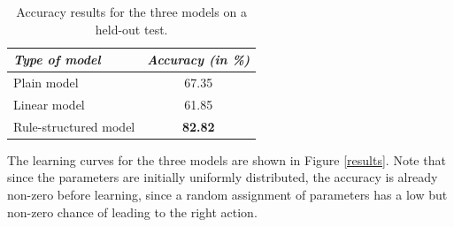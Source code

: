 \begin{table}[h]
\begin{center}
\begin{tabular}{|l|c|} \hline
\textit{Type of model} & \textit{Accuracy (in \%) } \\ \hline \hline
Plain model & 67.35 \\ \hline
Linear model & 61.85 \\ \hline
Rule-structured model & \textbf{82.82} \\ \hline
\end{tabular}
\end{center}
\vspace{-2mm}
\caption{Accuracy results for the three models on a held-out test.}
\vspace{-2mm}
\label{table}
\end{table}

The learning curves for the three models are shown in Figure \ref{results}.   Note that since the parameters are initially uniformly distributed, the accuracy is already non-zero before learning, since a random assignment of parameters has a low but non-zero chance of leading to the right action. 



